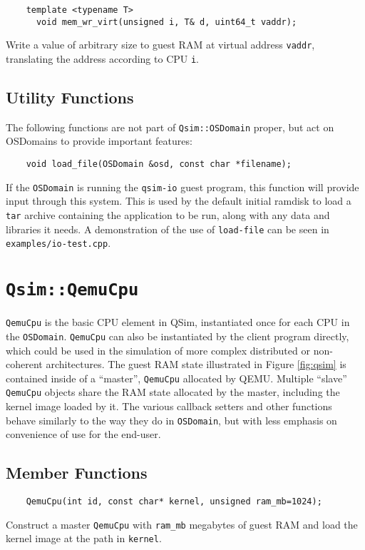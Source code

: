 \documentclass[letterpaper, 10pt]{book}
\begin{document}
\label{tf:mem_wr_virt} \begin{verbatim}
    template <typename T> 
      void mem_wr_virt(unsigned i, T& d, uint64_t vaddr);
\end{verbatim}

Write a value of arbitrary size to guest RAM at virtual address
\texttt{vaddr}, translating the address according to CPU \texttt{i}.

\subsection{Utility Functions}

The following functions are not part of \texttt{Qsim::OSDomain} proper, but act on OSDomains to provide important features:

\label{func:load_file} \begin{verbatim}
    void load_file(OSDomain &osd, const char *filename);
\end{verbatim}

If the \texttt{OSDomain} is running the \texttt{qsim-io} guest program, this
function will provide input through this system. This is used by the default
initial ramdisk to load a \texttt{tar} archive containing the application to be
run, along with any data and libraries it needs. A demonstration of the use of
\texttt{load-file} can be seen in \texttt{examples/io-test.cpp}.
\newpage

\section{\texttt{Qsim::QemuCpu}} \label{class:QemuCpu}
\texttt{QemuCpu} is the basic CPU element in QSim, instantiated once for each
CPU in the \texttt{OSDomain}. \texttt{QemuCpu} can also be instantiated by the
client program directly, which could be used in the simulation of more
complex distributed or non-coherent architectures. The guest RAM state 
illustrated in Figure \ref{fig:qsim} is contained inside of a ``master'',
\texttt{QemuCpu} allocated by QEMU. Multiple ``slave'' \texttt{QemuCpu}
objects share the RAM state allocated by the master, including the kernel
image loaded by it. The various callback setters and other functions behave
similarly to the way they do in \texttt{OSDomain}, but with less emphasis on
convenience of use for the end-user.

\subsection{Member Functions}
\begin{verbatim}
    QemuCpu(int id, const char* kernel, unsigned ram_mb=1024);
\end{verbatim}
Construct a master \texttt{QemuCpu} with \texttt{ram\_mb} megabytes of guest 
RAM and load the kernel image at the path in \texttt{kernel}. 
\end{document}
